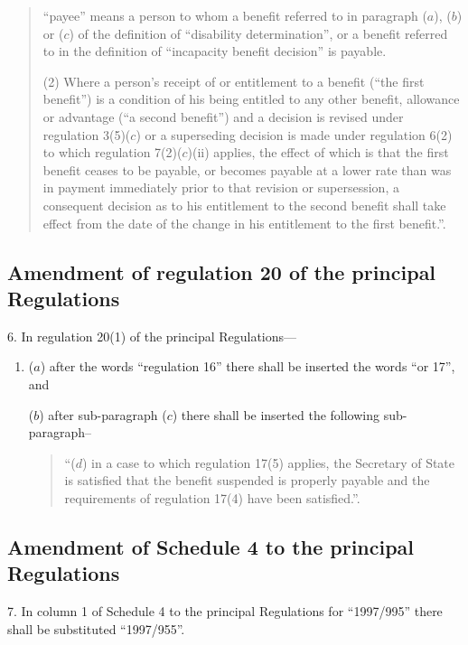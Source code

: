 \documentclass[12pt,a4paper]{article}
\begin{document}
\begin{quotation}
\begin{enumerate}
“payee” means a person to whom a benefit referred to in paragraph ($a$), ($b$) or ($c$) of the definition of “disability determination”, or a benefit referred to in the definition of “incapacity benefit decision” is payable.
\end{enumerate}

(2) Where a person’s receipt of or entitlement to a benefit (“the first benefit”) is a condition of his being entitled to any other benefit, allowance or advantage (“a second benefit”) and a decision is revised under regulation 3(5)($c$) or a superseding decision is made under regulation 6(2) to which regulation 7(2)($c$)(ii) applies, the effect of which is that the first benefit ceases to be payable, or becomes payable at a lower rate than was in payment immediately prior to that revision or supersession, a consequent decision as to his entitlement to the second benefit shall take effect from the date of the change in his entitlement to the first benefit.”.
\end{quotation}

\subsection[6. Amendment of regulation 20 of the principal Regulations]{Amendment of regulation 20 of the principal Regulations}

6.  In regulation 20(1) of the principal Regulations---
\begin{enumerate}\item[]
($a$) after the words “regulation 16” there shall be inserted the words “or 17”, and

($b$) after sub-paragraph ($c$) there shall be inserted the following sub-paragraph–
\begin{quotation}
“($d$) in a case to which regulation 17(5) applies, the Secretary of State is satisfied that the benefit suspended is properly payable and the requirements of regulation 17(4) have been satisfied.”.
\end{quotation}
\end{enumerate}

\subsection[7. Amendment of Schedule 4 to the principal Regulations]{Amendment of Schedule 4 to the principal Regulations}

7.  In column 1 of Schedule 4 to the principal Regulations for “1997/995” there shall be substituted “1997/955”. 
\end{document}
